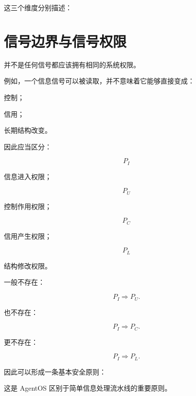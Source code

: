 这三个维度分别描述：

\begin{statementbox}
\centering
{}
\end{statementbox}

\begin{statementbox}
\centering
{}
\end{statementbox}

\begin{statementbox}
\centering
{}
\end{statementbox}

\section{信号边界与信号权限}

并不是任何信号都应该拥有相同的系统权限。

例如，一个信息信号可以被读取，并不意味着它能够直接变成：

控制；

信用；

长期结构改变。

因此应当区分：

\[
P_I
\]

信息进入权限；

\[
P_U
\]

控制作用权限；

\[
P_C
\]

信用产生权限；

\[
P_L
\]

结构修改权限。

一般不存在：

\[
P_I
\Rightarrow
P_U.
\]

也不存在：

\[
P_I
\Rightarrow
P_C.
\]

更不存在：

\[
P_I
\Rightarrow
P_L.
\]

因此可以形成一条基本安全原则：

\begin{statementbox}
\centering
{}
\end{statementbox}

这是 AgentOS 区别于简单信息处理流水线的重要原则。

